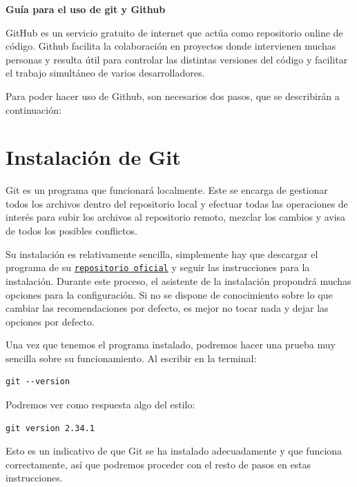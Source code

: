 \documentclass[
twoside,
12pt,                   
]{article}
\begin{document}
{\LARGE \textbf{Guía para el uso de git y Github}}
\par GitHub es un servicio gratuito de internet que actúa como repositorio online de código. Github facilita la colaboración en proyectos donde intervienen muchas personas y resulta útil para controlar las distintas versiones del código y facilitar el trabajo simultáneo de varios desarrolladores.
\par Para poder hacer uso de Github, son necesarios dos pasos, que se describirán a continuación:

\section{Instalación de Git}
Git es un programa que funcionará localmente. Este se encarga de gestionar todos los archivos dentro del repositorio local y efectuar todas las operaciones de interés para subir los archivos al repositorio remoto, mezclar los cambios y avisa de todos los posibles conflictos.
\par Su instalación es relativamente sencilla, simplemente hay que descargar el programa de su \href{https://git-scm.com/install/}{\texttt{repositorio oficial}} y seguir las instrucciones para la instalación. Durante este proceso, el asistente de la instalación propondrá muchas opciones para la configuración. Si no se dispone de conocimiento sobre lo que cambiar las recomendaciones por defecto, es mejor no tocar nada y dejar las opciones por defecto. 
\par Una vez que tenemos el programa instalado, podremos hacer una prueba muy sencilla sobre su funcionamiento. Al escribir en la terminal:
\begin{lstlisting}[style=powershell]
    git --version
\end{lstlisting}
Podremos ver como respuesta algo del estilo:
\begin{lstlisting}[style=powershell]
    git version 2.34.1
\end{lstlisting}
Esto es un indicativo de que Git se ha instalado adecuadamente y que funciona correctamente, así que podremos proceder con el resto de pasos en estas instrucciones.
\end{document}
